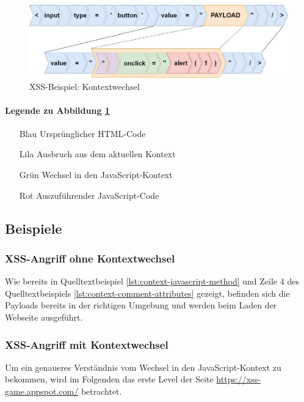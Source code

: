 		\begin{figure}[htbp] 
			\centering
			\includegraphics[width=\textwidth]{contents/images/PayloadContextSwitch}
			\caption{XSS-Beispiel: Kontextwechsel}
			\label{fig:PayloadContextSwitch}
		\end{figure}

\paragraph{Legende zu Abbildung \ref{fig:PayloadContextSwitch}}
		\begin{enumerate}
			\item[Blau] Ursprünglicher HTML-Code
			\item[Lila] Ausbruch aus dem aktuellen Kontext
			\item[Grün] Wechsel in den JavaScript-Kontext
			\item[Rot] Auszuführender JavaScript-Code
		\end{enumerate}
		
\subsection{Beispiele}
\subsubsection{\ac{XSS}-Angriff ohne Kontextwechsel}\label{ssec:example-without-context-change}
		Wie bereits in Quelltextbeispiel \ref{lst:context-javascript-method} und Zeile 4 des Quelltextbeispiels \ref{lst:context-comment-attributes} gezeigt, befinden sich die Payloads bereits in der richtigen Umgebung und werden beim Laden der Webseite ausgeführt.
		
\subsubsection{\ac{XSS}-Angriff mit Kontextwechsel}
		
		Um ein genaueres Verständnis vom Wechsel in den JavaScript-Kontext zu bekommen, wird im Folgenden das erste Level der Seite \url{https://xss-game.appspot.com/} betrachtet.
		
